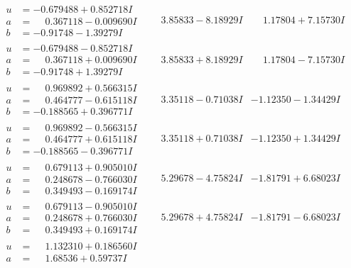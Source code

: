 \documentclass[1p]{elsarticle_modified}
\theoremstyle{definition}
\begin{document}
$$\begin{array}{c|c|c}
\begin{aligned}
u &= -0.679488 + 0.852718 I \\
a &= \phantom{-}0.367118 - 0.009690 I \\
b &= -0.91748 - 1.39279 I\end{aligned}
 & \phantom{-}3.85833 - 8.18929 I & \phantom{-}1.17804 + 7.15730 I \\ \hline\begin{aligned}
u &= -0.679488 - 0.852718 I \\
a &= \phantom{-}0.367118 + 0.009690 I \\
b &= -0.91748 + 1.39279 I\end{aligned}
 & \phantom{-}3.85833 + 8.18929 I & \phantom{-}1.17804 - 7.15730 I \\ \hline\begin{aligned}
u &= \phantom{-}0.969892 + 0.566315 I \\
a &= \phantom{-}0.464777 - 0.615118 I \\
b &= -0.188565 + 0.396771 I\end{aligned}
 & \phantom{-}3.35118 - 0.71038 I & -1.12350 - 1.34429 I \\ \hline\begin{aligned}
u &= \phantom{-}0.969892 - 0.566315 I \\
a &= \phantom{-}0.464777 + 0.615118 I \\
b &= -0.188565 - 0.396771 I\end{aligned}
 & \phantom{-}3.35118 + 0.71038 I & -1.12350 + 1.34429 I \\ \hline\begin{aligned}
u &= \phantom{-}0.679113 + 0.905010 I \\
a &= \phantom{-}0.248678 - 0.766030 I \\
b &= \phantom{-}0.349493 - 0.169174 I\end{aligned}
 & \phantom{-}5.29678 - 4.75824 I & -1.81791 + 6.68023 I \\ \hline\begin{aligned}
u &= \phantom{-}0.679113 - 0.905010 I \\
a &= \phantom{-}0.248678 + 0.766030 I \\
b &= \phantom{-}0.349493 + 0.169174 I\end{aligned}
 & \phantom{-}5.29678 + 4.75824 I & -1.81791 - 6.68023 I \\ \hline\begin{aligned}
u &= \phantom{-}1.132310 + 0.186560 I \\
a &= \phantom{-}1.68536 + 0.59737 I \\

\end{aligned}
\end{array}$$
\end{document}
